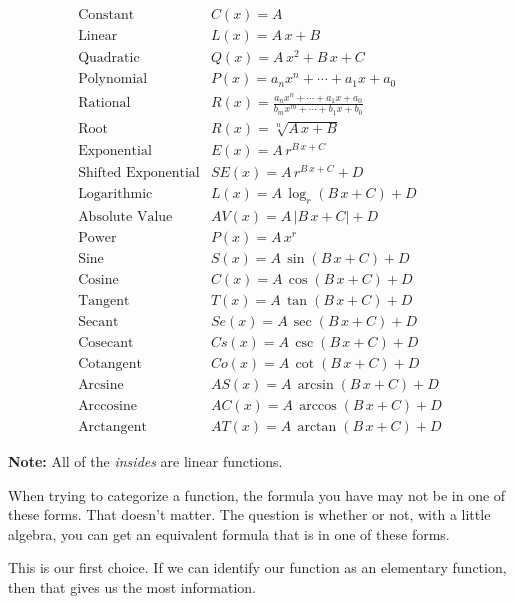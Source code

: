 \documentclass{ximera}
\begin{document}
\[
\begin{array}{ll}
\text{Constant}  & C(x) = A  \\
\text{Linear}  & L(x) = A \, x + B  \\
\text{Quadratic}  & Q(x) = A \, x^2 + B \, x + C  \\
\text{Polynomial}  & P(x) = a_n x^n + \cdots + a_1 x + a_0  \\
\text{Rational}  & R(x) = \frac{a_n x^n + \cdots + a_1 x + a_0}{b_m x^m + \cdots + b_1 x + b_0}  \\
\text{Root}  & R(x) = \sqrt[n]{A \, x + B}  \\
\text{Exponential}  & E(x) = A \, r^{B \, x + C}  \\
\text{Shifted Exponential}  & SE(x) = A \, r^{B \, x + C} + D  \\
\text{Logarithmic}  & L(x) = A \, \log_r(B \, x + C) + D  \\
\text{Absolute Value}  & AV(x) = A \, |B \, x + C| + D \\
\text{Power}  & P(x) = A \, x^r  \\
\text{Sine}  & S(x) = A \, \sin(B \, x + C) + D  \\
\text{Cosine}  & C(x) = A \, \cos(B \, x + C) + D  \\
\text{Tangent}  & T(x) = A \, \tan(B \, x + C) + D  \\
\text{Secant}  & Se(x) = A \, \sec(B \, x + C) + D  \\
\text{Cosecant}  & Cs(x) = A \, \csc(B \, x + C) + D  \\
\text{Cotangent}  & Co(x) = A \, \cot(B \, x + C) + D  \\
\text{Arcsine}  & AS(x) = A \, \arcsin(B \, x + C) + D  \\
\text{Arccosine}  & AC(x) = A \, \arccos(B \, x + C) + D  \\
\text{Arctangent}  & AT(x) = A \, \arctan(B \, x + C) + D  
\end{array}
\]


\textbf{Note:} All of the \textit{insides} are linear functions. 


When trying to categorize a function, the formula you have may not be in one of these forms.  That doesn't matter.  The question is whether or not, with a little algebra, you can get an equivalent formula that is in one of these forms. 


This is our first choice.  If we can identify our function as an elementary function, then that gives us the most information. 
\end{document}
